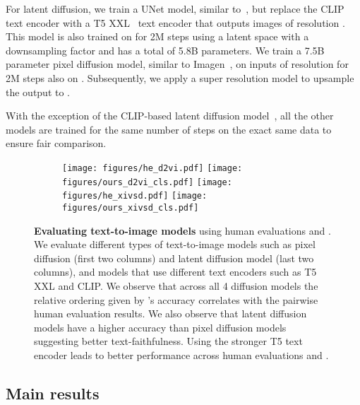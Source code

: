  For latent diffusion, we train a UNet model, similar to~\cite{rombach2022high}, but replace the CLIP text encoder with a T5 XXL~\cite{2020t5} text encoder
that outputs images of resolution .
This model is also trained on \DATASET for 2M steps using a latent space with a  downsampling factor and has a total of 5.8B parameters.
We train a 7.5B parameter pixel diffusion model, similar to Imagen~\cite{Saharia2022PhotorealisticTD}, on inputs of resolution  for 2M steps also on \DATASET.
Subsequently, we apply a super resolution model to upsample the output to .

With the exception of the CLIP-based latent diffusion model~\cite{rombach2022high}, all the other models are trained for the same number of steps on the exact same data to ensure fair comparison.
\begin{figure*}[!t]
    \centering
    \begin{subfigure}[b]{\textwidth}
        \centering
        \texttt{[image: figures/he\_d2vi.pdf]}\hfill
        \texttt{[image: figures/ours\_d2vi\_cls.pdf]}\label{exp:fig:main_res_pdm}
        \centering
        \texttt{[image: figures/he\_xivsd.pdf]}\hfill
        \texttt{[image: figures/ours\_xivsd\_cls.pdf]}

        \label{exp:fig:main_res_ldm}
    \end{subfigure}
    \caption{\textbf{Evaluating text-to-image models} using human evaluations and \OURS. We evaluate different types of text-to-image models such as pixel diffusion (first two columns) and latent diffusion model (last two columns), and models that use different text encoders such as T5 XXL and CLIP. We observe that across all 4 diffusion models the relative ordering given by \OURS's accuracy correlates with the pairwise human evaluation results. We also observe that latent diffusion models have a higher \OURS accuracy than pixel diffusion models suggesting better text-faithfulness.
    Using the stronger T5 text encoder leads to better performance across human evaluations and \OURS.
    }\vspace{-2em}
    \label{exp:fig:main_res_all}
\end{figure*}

\subsection{Main results}\label{subsec:exp:main_exp}

